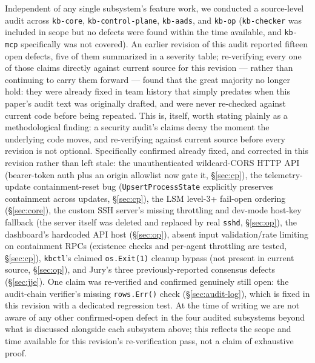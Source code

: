 \documentclass{article}
\begin{document}
Independent of any single subsystem's feature work, we conducted a
source-level audit across \texttt{kb-core}, \texttt{kb-control-plane},
\texttt{kb-aads}, and \texttt{kb-op} (\texttt{kb-checker} was included
in scope but no defects were found within the time available, and
\texttt{kb-mcp} specifically was not covered). An earlier revision of
this audit reported fifteen open defects, five of them summarized in a
severity table; re-verifying every one of those claims directly against
current source for this revision --- rather than continuing to carry
them forward --- found that the great majority no longer hold: they
were already fixed in team history that simply predates when this
paper's audit text was originally drafted, and were never re-checked
against current code before being repeated. This is, itself, worth
stating plainly as a methodological finding: a security audit's claims
decay the moment the underlying code moves, and re-verifying against
current source before every revision is not optional. Specifically
confirmed already fixed, and corrected in this revision rather than
left stale: the unauthenticated wildcard-CORS HTTP API (bearer-token
auth plus an origin allowlist now gate it, \S\ref{sec:cp}), the
telemetry-update containment-reset bug (\texttt{UpsertProcessState}
explicitly preserves containment across updates, \S\ref{sec:cp}), the
LSM level-3+ fail-open ordering (\S\ref{sec:core}), the custom SSH
server's missing throttling and dev-mode host-key fallback (the server
itself was deleted and replaced by real \texttt{sshd}, \S\ref{sec:op}),
the dashboard's hardcoded API host (\S\ref{sec:op}), absent input
validation/rate limiting on containment RPCs (existence checks and
per-agent throttling are tested, \S\ref{sec:cp}), \texttt{kbctl}'s
claimed \texttt{os.Exit(1)} cleanup bypass (not present in current
source, \S\ref{sec:op}), and Jury's three previously-reported consensus
defects (\S\ref{sec:jje}). One claim was re-verified and confirmed
genuinely still open: the audit-chain verifier's missing
\texttt{rows.Err()} check (\S\ref{sec:audit-log}), which is fixed in
this revision with a dedicated regression test. At the time of writing
we are not aware of any other confirmed-open defect in the four audited
subsystems beyond what is discussed alongside each subsystem above;
this reflects the scope and time available for this revision's
re-verification pass, not a claim of exhaustive proof.
\end{document}
